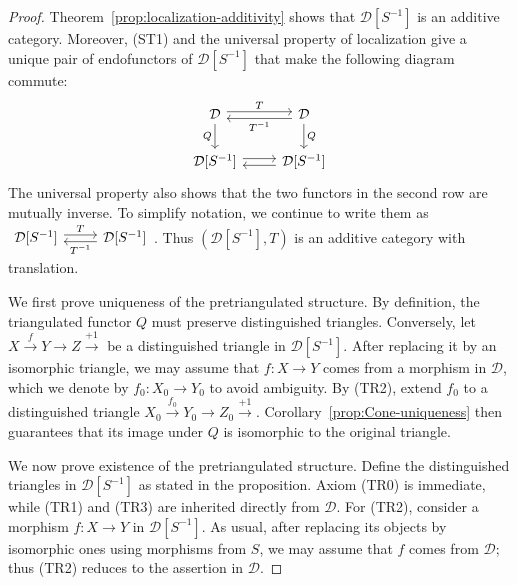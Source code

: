 \begin{proof}
	Theorem~\ref{prop:localization-additivity} shows that
	$\mathcal{D}[S^{-1}]$ is an additive category. Moreover, (ST1) and the
	universal property of localization give a unique pair of endofunctors of
	$\mathcal{D}[S^{-1}]$ that make the following diagram commute:
	\[\begin{tikzcd}
		\mathcal{D} \arrow[r, "T", shift left] \arrow[d, "Q"'] & \mathcal{D} \arrow[l, "{T^{-1}}", shift left] \arrow[d, "Q"] \\
		\mathcal{D}[S^{-1}] \arrow[r, shift left] & \mathcal{D}[S^{-1}] \arrow[l, shift left]
	\end{tikzcd}\]
	The universal property also shows that the two functors in the second row
	are mutually inverse. To simplify notation, we continue to write them as
	$\begin{tikzcd}
		\mathcal{D}[S^{-1}] \arrow[r, "T", shift left] & \mathcal{D}[S^{-1}] \arrow[l, "{T^{-1}}", shift left]
	\end{tikzcd}$.
	Thus $(\mathcal{D}[S^{-1}], T)$ is an additive category with translation.
	
	We first prove uniqueness of the pretriangulated structure. By definition,
	the triangulated functor $Q$ must preserve distinguished triangles.
	Conversely, let
	$X \xrightarrow{f} Y \to Z \xrightarrow{+1}$ be a distinguished triangle
	in $\mathcal{D}[S^{-1}]$. After replacing it by an isomorphic triangle,
	we may assume that $f: X \to Y$ comes from a morphism in $\mathcal{D}$,
	which we denote by $f_0: X_0 \to Y_0$ to avoid ambiguity. By (TR2), extend
	$f_0$ to a distinguished triangle
	$X_0 \xrightarrow{f_0} Y_0 \to Z_0 \xrightarrow{+1}$.
	Corollary~\ref{prop:Cone-uniqueness} then guarantees that its image under
	$Q$ is isomorphic to the original triangle.
	
	We now prove existence of the pretriangulated structure. Define the
	distinguished triangles in $\mathcal{D}[S^{-1}]$ as stated in the
	proposition. Axiom (TR0) is immediate, while (TR1) and (TR3) are inherited
	directly from $\mathcal{D}$. For (TR2), consider a morphism
	$f: X \to Y$ in $\mathcal{D}[S^{-1}]$. As usual, after replacing its
	objects by isomorphic ones using morphisms from $S$, we may assume that
	$f$ comes from $\mathcal{D}$; thus (TR2) reduces to the assertion in
	$\mathcal{D}$.
	

\end{proof}
